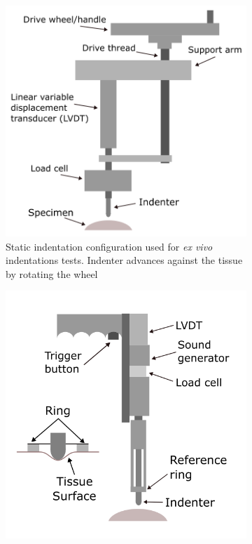 \begin{figure}
        \centering
        \begin{subfigure}[b]{0.45\textwidth}
        \centering
        \includegraphics[width=\textwidth]{Images/chapter1/indentation1carter.png}
        \caption{Static indentation configuration used for \textit{ex vivo} indentations tests. Indenter advances against the tissue by rotating the wheel}
        \label{fig:carter1}
        \end{subfigure}
        \hfill
        \begin{subfigure}[b]{0.45\textwidth}
        \centering
        \includegraphics[width=\textwidth]{Images/chapter1/indentation2carter.png}

\end{subfigure}
\end{figure}
